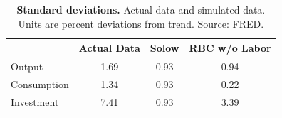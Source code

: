 \begin{table}[h] \caption{\label{tab013_intro_rbc_modeling_solow_rbc_without_labor_stds} \textbf{Standard deviations.} Actual data and simulated data. Units are percent deviations from trend. {\tiny Source: FRED}.}
\begin{center}\hspace*{-.5cm}

\begin{tabular}{lccc}
\toprule
{} &  Actual Data &  Solow &  RBC w/o Labor \\
\midrule
Output      &         1.69 &   0.93 &           0.94 \\
Consumption &         1.34 &   0.93 &           0.22 \\
Investment  &         7.41 &   0.93 &           3.39 \\
\bottomrule
\end{tabular}
\end{center}
\end{table}